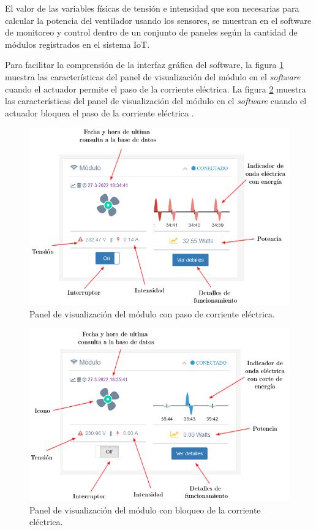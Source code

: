 El valor de las variables físicas de tensión e intensidad que son necesarias para calcular la  potencia del ventilador usando los sensores, se muestran en el software de monitoreo y control dentro de un conjunto de paneles según la cantidad de módulos registrados en el sistema IoT.

Para facilitar la comprensión de la interfaz gráfica del software, la figura \ref{fig:test-panel5} muestra las características del panel de visualización del módulo en el \emph{software} cuando el actuador permite el paso de la corriente eléctrica. La figura \ref{fig:test-panel4} muestra las características del panel de visualización del módulo en el \emph{software} cuando el actuador bloquea el paso de la corriente eléctrica .

\begin{figure}[htpb]
\centering 
\includegraphics[width=1.0\textwidth]{./Figures/test/consumo/panel5.png}
\caption{Panel de visualización del módulo con paso de corriente eléctrica.}
\label{fig:test-panel5}
\end{figure}


\begin{figure}[htpb]
\centering 
\includegraphics[width=1.0\textwidth]{./Figures/test/consumo/panel4.png}
\caption{Panel de visualización del módulo con bloqueo de la corriente eléctrica.}
\label{fig:test-panel4}
\end{figure}

